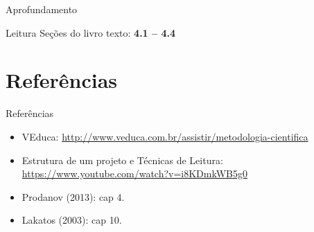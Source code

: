 \documentclass{beamer}
\begin{document}
\begin{frame}{Aprofundamento}
  \begin{block}{Leitura}
    Seções do livro texto: {\bf 4.1 -- 4.4}
  \end{block}
\end{frame}

\section{Referências}

\begin{frame}{Referências}
  \begin{itemize}
  \item<1-> VEduca:
    \url{http://www.veduca.com.br/assistir/metodologia-cientifica}
  \item<1-> Estrutura de um projeto e Técnicas de Leitura:
    \url{https://www.youtube.com/watch?v=i8KDmkWB5g0}
  \item<1-> Prodanov (2013): cap 4.
  \item<1-> Lakatos (2003): cap 10.
  \end{itemize}
\end{frame}
\end{document}
